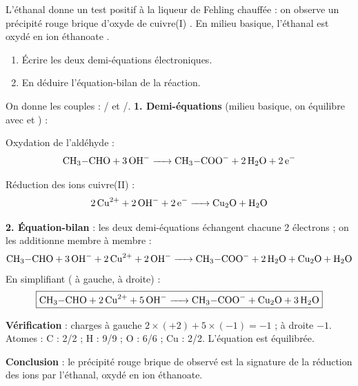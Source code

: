 \documentclass[11pt]{article}
\begin{document}
\begin{exoresolu}
L'éthanal  donne un test positif à la liqueur de Fehling chauffée : on observe un précipité rouge brique d'oxyde de cuivre(I) . En milieu basique, l'éthanal est oxydé en ion éthanoate .
\begin{enumerate}
\item Écrire les deux demi-équations électroniques.
\item En déduire l'équation-bilan de la réaction.
\end{enumerate}
On donne les couples : / et /.
\tcblower
\textbf{1. Demi-équations} (milieu basique, on équilibre avec  et ) :

Oxydation de l'aldéhyde :
\[
\ce{CH3-CHO + 3OH- -> CH3-COO- + 2H2O + 2e-}
\]

Réduction des ions cuivre(II) :
\[
\ce{2Cu^2+ + 2OH- + 2e- -> Cu2O + H2O}
\]

\textbf{2. Équation-bilan} : les deux demi-équations échangent chacune 2 électrons ; on les additionne membre à membre :
\[
\ce{CH3-CHO + 3OH- + 2Cu^2+ + 2OH- -> CH3-COO- + 2H2O + Cu2O + H2O}
\]
En simplifiant ( à gauche,  à droite) :
\[
\boxed{\ce{CH3-CHO + 2Cu^2+ + 5OH- -> CH3-COO- + Cu2O + 3H2O}}
\]

\textbf{Vérification} : charges à gauche $2\times(+2) + 5\times(-1) = -1$ ; à droite $-1$. Atomes : C : 2/2 ; H : 9/9 ; O : 6/6 ; Cu : 2/2. L'équation est équilibrée.

\textbf{Conclusion} : le précipité rouge brique de  observé est la signature de la réduction des ions  par l'éthanal, oxydé en ion éthanoate.
\end{exoresolu}
\end{document}
